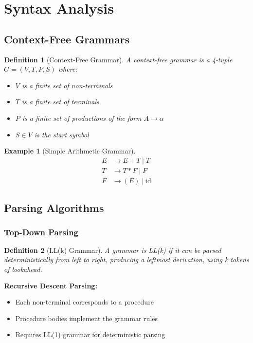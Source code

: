 \documentclass[11pt]{article}
\newtheorem{definition}{Definition}[section]
\newtheorem{example}{Example}[section]
\begin{document}
\section{Syntax Analysis}

\subsection{Context-Free Grammars}

\begin{definition}[Context-Free Grammar]
A context-free grammar is a 4-tuple $G = (V, T, P, S)$ where:
\begin{itemize}
    \item $V$ is a finite set of non-terminals
    \item $T$ is a finite set of terminals
    \item $P$ is a finite set of productions of the form $A \to \alpha$
    \item $S \in V$ is the start symbol
\end{itemize}
\end{definition}

\begin{example}[Simple Arithmetic Grammar]
\begin{align}
E &\to E + T \mid T \\
T &\to T * F \mid F \\
F &\to (E) \mid \text{id}
\end{align}
\end{example}

\subsection{Parsing Algorithms}

\subsubsection{Top-Down Parsing}

\begin{definition}[LL(k) Grammar]
A grammar is LL(k) if it can be parsed deterministically from left to right, producing a leftmost derivation, using k tokens of lookahead.
\end{definition}

\textbf{Recursive Descent Parsing:}
\begin{itemize}
    \item Each non-terminal corresponds to a procedure
    \item Procedure bodies implement the grammar rules
    \item Requires LL(1) grammar for deterministic parsing
\end{itemize}
\end{document}
